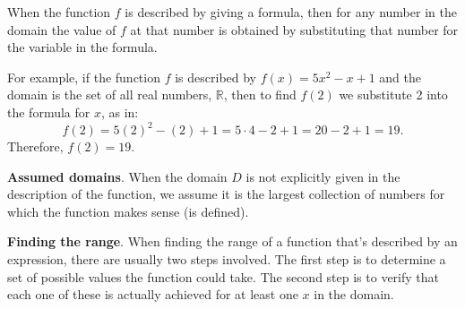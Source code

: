 \documentclass[11pt]{book}               %
\begin{document}
When the function $f$ is described by giving a formula, then for any number in the domain the value of $f$ at that number is obtained by substituting that number for the variable in the formula.

For example, if the function $f$ is described by  $ f(x) = 5x^2 - x +1 $ and the domain is the set of all real numbers, $\mathbb{R}$, 
then to find $ f(2) $ we substitute 2 into the formula for $x$, as in: 
\[f(2) = 5(2)^2 - (2) + 1 = 5 \cdot 4 - 2 + 1 = 20 - 2 + 1 = 19. \] 
Therefore, $ f(2) = 19 $.

\textbf{Assumed domains}. When the domain $D$ is not explicitly given in the description of the function, we assume it is the largest collection of numbers for which the function makes sense (is defined).  %

\textbf{Finding the range}. When finding the range of a function that's described by an expression, there are usually two steps involved.  The first step is to determine a set of possible values the function could take.  The second step is to verify that each one of these is actually achieved for at least one $x$ in the domain.



\end{document}
